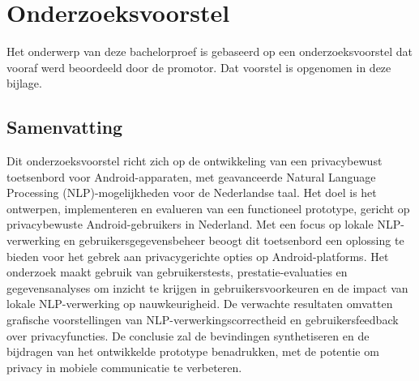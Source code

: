 \documentclass[dutch,dit,thesis]{hogentreport}
\begin{document}





%
%





\appendix

\chapter{Onderzoeksvoorstel}

Het onderwerp van deze bachelorproef is gebaseerd op een onderzoeksvoorstel dat vooraf werd beoordeeld door de promotor. Dat voorstel is opgenomen in deze bijlage.

\section*{Samenvatting}

  Dit onderzoeksvoorstel richt zich op de ontwikkeling van een privacybewust toetsenbord voor Android-apparaten, met geavanceerde Natural Language Processing (NLP)-mogelijkheden voor de Nederlandse taal. Het doel is het ontwerpen, implementeren en evalueren van een functioneel prototype, gericht op privacybewuste Android-gebruikers in Nederland. Met een focus op lokale NLP-verwerking en gebruikersgegevensbeheer beoogt dit toetsenbord een oplossing te bieden voor het gebrek aan privacygerichte opties op Android-platforms. Het onderzoek maakt gebruik van gebruikerstests, prestatie-evaluaties en gegevensanalyses om inzicht te krijgen in gebruikersvoorkeuren en de impact van lokale NLP-verwerking op nauwkeurigheid. De verwachte resultaten omvatten grafische voorstellingen van NLP-verwerkingscorrectheid en gebruikersfeedback over privacyfuncties. De conclusie zal de bevindingen synthetiseren en de bijdragen van het ontwikkelde prototype benadrukken, met de potentie om privacy in mobiele communicatie te verbeteren.






\backmatter{}

\setlength\bibitemsep{2pt} %
\printbibliography[heading=bibintoc]
\end{document}
